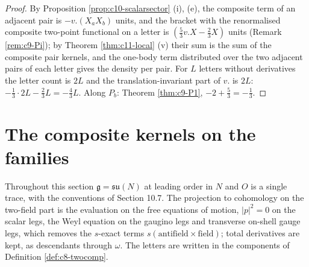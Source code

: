 \begin{proof}
By Proposition \ref{prop:c10-scalarsector} (i), (e), the composite term of an adjacent pair is $-v.(X_aX_b)$ units, and the bracket with the renormalised composite two-point functional on a letter is $(\tfrac53v.X-\tfrac23X)$ units (Remark \ref{rem:c9-Pi}); by Theorem \ref{thm:c11-local} (v) their sum is the sum of the composite pair kernels, and the one-body term distributed over the two adjacent pairs of each letter gives the density per pair. For $L$ letters without derivatives the letter count is $2L$ and the translation-invariant part of $v.$ is $2L$: $-\tfrac13\cdot2L-\tfrac23L=-\tfrac43L$. Along $P_b$: Theorem \ref{thm:c9-P1}, $-2+\tfrac53=-\tfrac13$.
\end{proof}

\section{The composite kernels on the families}

Throughout this section $\mathfrak g=\mathfrak{su}(N)$ at leading order in $N$ and $O$ is a single trace, with the conventions of Section 10.7. The projection to cohomology on the two-field part is the evaluation on the free equations of motion, $|p|^2=0$ on the scalar legs, the Weyl equation on the gaugino legs and transverse on-shell gauge legs, which removes the $s$-exact terms $s(\text{antifield}\times\text{field})$; total derivatives are kept, as descendants through $\omega$. The letters are written in the components of Definition \ref{def:c8-twocomp}.

